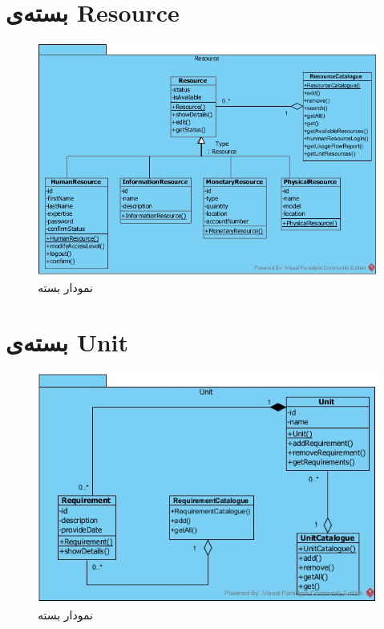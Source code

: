 \section{بسته‌ی Resource}
\begin{figure}[H]
	\centering
	\includegraphics[scale=0.7]{img/pkg/ResourcePackage}
	\caption{نمودار بسته}
\end{figure}
\section{بسته‌ی Unit}
\begin{figure}[H]
	\centering
	\includegraphics[scale=0.8]{img/pkg/UnitPackage}
	\caption{نمودار بسته}
\end{figure}
